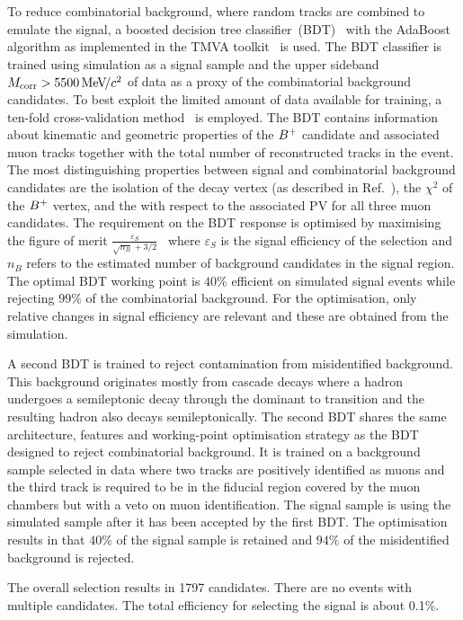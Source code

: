To reduce combinatorial background, where random tracks are combined to emulate the signal, a boosted decision tree classifier~(BDT)~\cite{Breiman} with the AdaBoost algorithm\cite{AdaBoost} as implemented in the TMVA toolkit~\cite{Hocker:2007ht,*TMVA4} is used. The BDT classifier is trained using simulation as a signal sample and the upper sideband $M_{\rm{corr}} > 5500{\mathrm{\,Me\kern -0.1em V\!/}c^2}$ of data as a proxy of the combinatorial background candidates. To best exploit the limited amount of data available for training, a ten-fold cross-validation method~\cite{kfold} is employed. The BDT contains information about kinematic and geometric properties of the ${{{B}^+}}$ candidate and associated muon tracks together with the total number of reconstructed tracks in the event. The most distinguishing properties between signal and combinatorial background candidates are the isolation of the decay vertex (as described in Ref.~\cite{LHCb-PAPER-2015-025}), the $\chi^2$ of the ${{{B}^+}}$ vertex, and the \chisqip with respect to the associated PV for all three muon candidates. The requirement on the BDT response is optimised by maximising the figure of merit $\frac{\varepsilon_{S}}{\sqrt{n_B}+3/2}$~\cite{Punzi:2003bu} where $\varepsilon_{S}$ is the signal efficiency of the selection and $n_B$ refers to the estimated number of background candidates in the signal region. The optimal BDT working point is $40\%$ efficient on simulated signal events while rejecting $99\%$ of the combinatorial background. For the optimisation, only relative changes in signal efficiency are relevant and these are obtained from the simulation.

A second BDT is trained to reject contamination from misidentified
background. This background originates mostly from cascade decays where a
\bquark hadron undergoes a semileptonic decay through the dominant \bquark
to \cquark transition and the resulting \cquark hadron also decays
semileptonically. The second BDT shares the same architecture, features 
and
working-point optimisation strategy as the BDT designed to reject
combinatorial background. It is trained on a
background sample selected in data where two tracks are positively
identified as muons and the third track is required to be in the fiducial
region covered by the muon chambers but with a veto on muon
identification. The signal sample is using the simulated sample after it has been accepted by the first BDT. The optimisation results in that $40\%$ of the signal sample is retained and $94\%$ of the misidentified background is
rejected.

The overall selection results in 1797 candidates. There are no events with multiple candidates. The total efficiency for selecting the signal is about 0.1\%.
